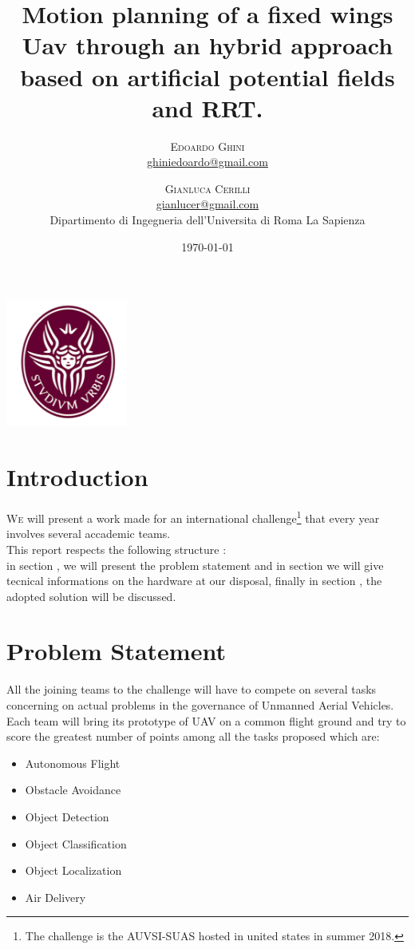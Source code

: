 \documentclass[oneside,onecolumn]{article}
\title{Motion planning of a fixed wings Uav through an hybrid approach based on artificial potential
  fields and RRT. } %
\author{%
  \textsc{Edoardo Ghini} \\[1ex] %
  \normalsize \href{mailto:ghiniedoardo@gmail.com}{ghiniedoardo@gmail.com} %
  \and %
  \textsc{Gianluca Cerilli} \\[1ex] %
  \normalsize \href{mailto:gianlucer@gmail.com}{gianlucer@gmail.com}\\ %
  \normalsize Dipartimento di Ingegneria dell'Universita di Roma La Sapienza\\
}
\date{\today} %
\begin{document}
\maketitle
\bigskip
\bigskip
\bigskip
\bigskip
\begin{center}
  \includegraphics[width=0.3\textwidth]{laSapienza}
\end{center}


\newpage
\section{Introduction}

\lettrine[nindent=0em,lines=3]{W}e will present a work made
for an international challenge\footnote{The challenge is the AUVSI-SUAS hosted
  in united states in summer 2018.} that every year involves several accademic teams.\\
This report respects the following structure : \\
in section , we will present the problem statement and in section
 we will give tecnical informations on the hardware at our disposal,
finally in section , the adopted solution will be discussed.


\section{Problem Statement}
All the joining teams to the challenge will have to compete on several tasks
concerning on actual problems in the governance of Unmanned Aerial Vehicles.\\
Each team will bring its prototype of UAV on a common flight ground and try to
score the greatest number of points among all the tasks proposed which are:
\begin{itemize}
\item Autonomous Flight
\item Obstacle Avoidance
\item Object Detection
\item Object Classification
\item Object Localization 
\item Air Delivery
\end{itemize}
\end{document}
